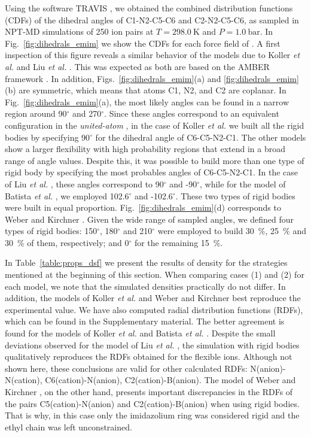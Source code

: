 \documentclass[3p,twocolumn]{elsarticle}
\begin{document}
Using the software TRAVIS \cite{Brehm_2011}, we obtained the combined distribution functions (CDFs) of the dihedral angles of C1-N2-C5-C6 and C2-N2-C5-C6, as sampled in NPT-MD simulations of 250 ion pairs at $T = 298.0~\text{K}$ and $P = 1.0~\text{bar}$.
In Fig.~\ref{fig:dihedrals_emim} we show the CDFs for each force field of \ce{[emim][B(CN)_4]}.
A first inspection of this figure reveals a similar behavior of the models due to Koller \textit{et al.} \cite{Koller_2012} and Liu \textit{et al.} \cite{Liu_2014}.
This was expected as both are based on the AMBER framework \cite{Cornell_1995}.
In addition, Figs.~\ref{fig:dihedrals_emim}(a) and \ref{fig:dihedrals_emim}(b) are symmetric, which means that atoms C1, N2, and C2 are coplanar.
In Fig.~\ref{fig:dihedrals_emim}(a), the most likely angles can be found in a narrow region around 90$^{\circ}$ and 270$^{\circ}$.
Since these angles correspond to an equivalent configuration in the \textit{united-atom} \ce{[emim]^+}, in the case of Koller \textit{et al.} \cite{Koller_2012} we built all the rigid bodies by specifying 90$^{\circ}$ for the dihedral angle of C6-C5-N2-C1.
The other models show a larger flexibility with high probability regions that extend in a broad range of angle values.
Despite this, it was possible to build more than one type of rigid body by specifying the most probables angles of C6-C5-N2-C1.
In the case of Liu \textit{et al.} \cite{Liu_2014}, these angles correspond to 90$^{\circ}$ and -90$^{\circ}$, while for the model of Batista \textit{et al.} \cite{Batista_2015}, we employed 102.6$^{\circ}$ and -102.6$^{\circ}$.
These two types of rigid bodies were built in equal proportion.
Fig.~\ref{fig:dihedrals_emim}(d) corresponds to Weber and Kirchner \cite{Weber_2016}. 
Given the wide range of sampled angles, we defined four types of rigid bodies: 150$^{\circ}$, 180$^{\circ}$ and 210$^{\circ}$ were employed to build 30~\%, 25~\% and 30~\% of them, respectively; and 0$^{\circ}$ for the remaining 15~\%.

In Table~\ref{table:props_dsf} we present the results of density for the strategies mentioned at the beginning of this section.
When comparing cases (1) and (2) for each model, we note that the simulated densities practically do not differ.
In addition, the models of Koller \textit{et al.} \cite{Koller_2012} and Weber and Kirchner \cite{Weber_2016} best reproduce the experimental value.
We have also computed radial distribution functions (RDFs), which can be found in the Supplementary material.
The better agreement is found for the models of Koller \textit{et al.} \cite{Koller_2012} and Batista \textit{et al.} \cite{Batista_2015}.
Despite the small deviations observed for the model of Liu \textit{et al.} \cite{Liu_2014}, the simulation with rigid bodies qualitatively reproduces the RDFs obtained for the flexible ions.
Although not shown here, these conclusions are valid for other calculated RDFs: N(anion)-N(cation), C6(cation)-N(anion), C2(cation)-B(anion).
The model of Weber and Kirchner \cite{Weber_2016}, on the other hand, presents important discrepancies in the RDFs of the pairs C5(cation)-N(anion) and C2(cation)-B(anion) when using rigid bodies.
That is why, in this case only the imidazolium ring was considered rigid and the ethyl chain was left unconstrained. 
\end{document}
